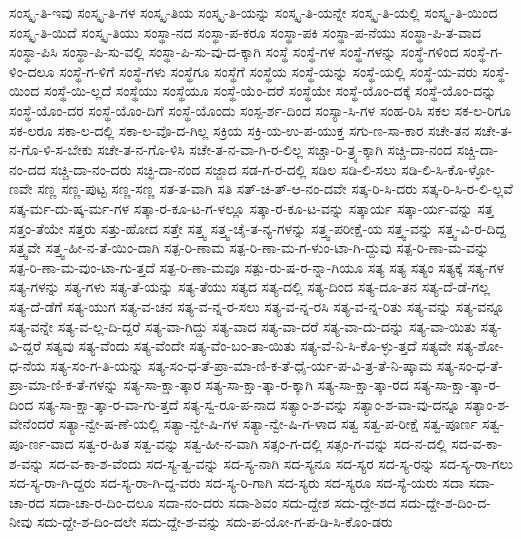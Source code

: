 {ಸಂಸ್ಕೃ-ತಿ-ಇವು
ಸಂಸ್ಕೃ-ತಿ-ಗಳ
ಸಂಸ್ಕೃ-ತಿಯ
ಸಂಸ್ಕೃ-ತಿ-ಯನ್ನು
ಸಂಸ್ಕೃ-ತಿ-ಯನ್ನೇ
ಸಂಸ್ಕೃ-ತಿ-ಯಲ್ಲಿ
ಸಂಸ್ಕೃ-ತಿ-ಯಿಂದ
ಸಂಸ್ಕೃ-ತಿ-ಯಿದೆ
ಸಂಸ್ಕೃ-ತಿಯು
ಸಂಸ್ಥಾ-ನದ
ಸಂಸ್ಥಾ-ಪ-ಕರೂ
ಸಂಸ್ಥಾ-ಪಕಿ
ಸಂಸ್ಥಾ-ಪ-ನೆಯು
ಸಂಸ್ಥಾ-ಪಿ-ತ-ವಾದ
ಸಂಸ್ಥಾ-ಪಿಸಿ
ಸಂಸ್ಥಾ-ಪಿ-ಸು-ವಲ್ಲಿ
ಸಂಸ್ಥಾ-ಪಿ-ಸು-ವು-ದ-ಕ್ಕಾಗಿ
ಸಂಸ್ಥೆ
ಸಂಸ್ಥೆ-ಗಳ
ಸಂಸ್ಥೆ-ಗಳನ್ನು
ಸಂಸ್ಥೆ-ಗಳಿಂದ
ಸಂಸ್ಥೆ-ಗ-ಳಿಂ-ದಲೂ
ಸಂಸ್ಥೆ-ಗ-ಳಿಗೆ
ಸಂಸ್ಥೆ-ಗಳು
ಸಂಸ್ಥೆಗೂ
ಸಂಸ್ಥೆಗೆ
ಸಂಸ್ಥೆಯ
ಸಂಸ್ಥೆ-ಯನ್ನು
ಸಂಸ್ಥೆ-ಯಲ್ಲಿ
ಸಂಸ್ಥೆ-ಯ-ವರು
ಸಂಸ್ಥೆ-ಯಿಂದ
ಸಂಸ್ಥೆ-ಯಿ-ಲ್ಲದೆ
ಸಂಸ್ಥೆಯು
ಸಂಸ್ಥೆಯೂ
ಸಂಸ್ಥೆ-ಯೆಂ-ದರೆ
ಸಂಸ್ಥೆಯೇ
ಸಂಸ್ಥೆ-ಯೊಂ-ದಕ್ಕೆ
ಸಂಸ್ಥೆ-ಯೊಂ-ದನ್ನು
ಸಂಸ್ಥೆ-ಯೊಂ-ದರ
ಸಂಸ್ಥೆ-ಯೊಂ-ದಿಗೆ
ಸಂಸ್ಥೆ-ಯೊಂದು
ಸಂಸ್ಪ-ರ್ಶ-ದಿಂದ
ಸಂಸ್ಯಾ-ಸಿ-ಗಳ
ಸಂಹ-ರಿಸಿ
ಸಕಲ
ಸಕ-ಲ-ರಿಗೂ
ಸಕ-ಲರೂ
ಸಕಾ-ಲ-ದಲ್ಲಿ
ಸಕಾ-ಲ-ವೊ-ದ-ಗಿಲ್ಲ
ಸಕ್ರಿಯ
ಸಕ್ರಿ-ಯ-ಉ-ಪ-ಯುಕ್ತ
ಸಗು-ಣ-ಸಾ-ಕಾರ
ಸಚೇ-ತನ
ಸಚೇ-ತ-ನ-ಗೊ-ಳಿ-ಸ-ಬೇಕು
ಸಚೇ-ತ-ನ-ಗೊ-ಳಿಸಿ
ಸಚೇ-ತ-ನ-ವಾ-ಗಿ-ರ-ಲಿಲ್ಲ
ಸಚ್ಚಾ-ರಿ-ತ್ರ್ಯ-ಕ್ಕಾಗಿ
ಸಚ್ಚಿ-ದಾ-ನಂದ
ಸಚ್ಚಿ-ದಾ-ನಂ-ದದ
ಸಚ್ಚಿ-ದಾ-ನಂ-ದರು
ಸಚ್ಛಿ-ದಾ-ನಂದ
ಸಜ್ಜಾದ
ಸಡ-ಗ-ರ-ದಲ್ಲಿ
ಸಡಿಲ
ಸಡಿ-ಲಿ-ಸಲು
ಸಡಿ-ಲಿ-ಸಿ-ಕೊ-ಳ್ಳೋ-ಣವೇ
ಸಣ್ಣ
ಸಣ್ಣ-ಪುಟ್ಟ
ಸಣ್ಣ-ಸಣ್ಣ
ಸತ-ತ-ವಾಗಿ
ಸತಿ
ಸತ್-ಚಿ-ತ್-ಆ-ನಂ-ದವೇ
ಸತ್ಕ-ರಿ-ಸಿ-ದರು
ಸತ್ಕ-ರಿ-ಸಿ-ರ-ಲಿ-ಲ್ಲವೆ
ಸತ್ಕ-ರ್ಮ-ದು-ಷ್ಕ-ರ್ಮ-ಗಳ
ಸತ್ಕಾ-ರ-ಕೂ-ಟ-ಗ-ಳಲ್ಲೂ
ಸತ್ಕಾ-ರ-ಕೂ-ಟ-ವನ್ನು
ಸತ್ಕಾರ್ಯ
ಸತ್ಕಾ-ರ್ಯ-ವನ್ನು
ಸತ್ತ
ಸತ್ತಂ-ತೆಯೇ
ಸತ್ತರು
ಸತ್ತು-ಹೋದ
ಸತ್ತೇ
ಸತ್ತ್ವ
ಸತ್ತ್ವ-ಚೈ-ತ-ನ್ಯ-ಗಳನ್ನು
ಸತ್ತ್ವ-ಪರೀಕ್ಷೆ-ಯ
ಸತ್ತ್ವ-ವನ್ನು
ಸತ್ತ್ವ-ವಿ-ರ-ದಿದ್ದ
ಸತ್ತ್ವವೇ
ಸತ್ತ್ವ-ಹೀ-ನ-ತೆ-ಯಿಂ-ದಾಗಿ
ಸತ್ಪ-ರಿ-ಣಾಮ
ಸತ್ಪ-ರಿ-ಣಾ-ಮ-ಗ-ಳುಂ-ಟಾ-ಗಿ-ದ್ದುವು
ಸತ್ಪ-ರಿ-ಣಾ-ಮ-ವನ್ನು
ಸತ್ಪ-ರಿ-ಣಾ-ಮ-ವುಂ-ಟಾ-ಗು-ತ್ತದೆ
ಸತ್ಪ-ರಿ-ಣಾ-ಮವೂ
ಸತ್ಪು-ರು-ಷ-ರ-ನ್ನಾ-ಗಿಯೂ
ಸತ್ಯ
ಸತ್ಯ
ಸತ್ಯಂ
ಸತ್ಯಕ್ಕೆ
ಸತ್ಯ-ಗಳ
ಸತ್ಯ-ಗಳನ್ನು
ಸತ್ಯ-ಗಳು
ಸತ್ಯ-ತೆ-ಯನ್ನು
ಸತ್ಯ-ತೆಯು
ಸತ್ಯದ
ಸತ್ಯ-ದಲ್ಲಿ
ಸತ್ಯ-ದಿಂದ
ಸತ್ಯ-ದೂ-ತನ
ಸತ್ಯ-ದೆ-ಡೆ-ಗಲ್ಲ
ಸತ್ಯ-ದೆ-ಡೆಗೆ
ಸತ್ಯ-ಯುಗ
ಸತ್ಯ-ವ-ಚನ
ಸತ್ಯ-ವ-ನ್ನ-ರ-ಸಲು
ಸತ್ಯ-ವ-ನ್ನ-ರಸಿ
ಸತ್ಯ-ವ-ನ್ನ-ರಿತು
ಸತ್ಯ-ವನ್ನು
ಸತ್ಯ-ವನ್ನೂ
ಸತ್ಯ-ವನ್ನೇ
ಸತ್ಯ-ವ-ಲ್ಲ-ದಿ-ದ್ದರೆ
ಸತ್ಯ-ವಾ-ಗಿದ್ದು
ಸತ್ಯ-ವಾದ
ಸತ್ಯ-ವಾ-ದರೆ
ಸತ್ಯ-ವಾ-ದು-ದನ್ನು
ಸತ್ಯ-ವಾ-ಯಿತು
ಸತ್ಯ-ವಿ-ದ್ದರೆ
ಸತ್ಯವು
ಸತ್ಯ-ವೆಂದು
ಸತ್ಯ-ವೆಂದೇ
ಸತ್ಯ-ವೆಂ-ಬಂ-ತಾ-ಯಿತು
ಸತ್ಯ-ವೆ-ನಿ-ಸಿ-ಕೊ-ಳ್ಳು-ತ್ತದೆ
ಸತ್ಯವೇ
ಸತ್ಯ-ಶೋ-ಧ-ನೆಯ
ಸತ್ಯ-ಸಂ-ಗ-ತಿ-ಯನ್ನು
ಸತ್ಯ-ಸಂ-ಧ-ತೆ-ಪ್ರಾ-ಮಾ-ಣಿ-ಕ-ತೆ-ಧೈ-ರ್ಯ-ಪ-ವಿ-ತ್ರ-ತೆ-ನಿ-ಷ್ಕಾಮ
ಸತ್ಯ-ಸಂ-ಧ-ತೆ-ಪ್ರಾ-ಮಾ-ಣಿ-ಕ-ತೆ-ಗಳನ್ನು
ಸತ್ಯ-ಸಾ-ಕ್ಷಾ-ತ್ಕಾರ
ಸತ್ಯ-ಸಾ-ಕ್ಷಾ-ತ್ಕಾ-ರ-ಕ್ಕಾಗಿ
ಸತ್ಯ-ಸಾ-ಕ್ಷಾ-ತ್ಕಾ-ರದ
ಸತ್ಯ-ಸಾ-ಕ್ಷಾ-ತ್ಕಾ-ರ-ದಿಂದ
ಸತ್ಯ-ಸಾ-ಕ್ಷಾ-ತ್ಕಾ-ರ-ವಾ-ಗು-ತ್ತದೆ
ಸತ್ಯ-ಸ್ವ-ರೂ-ಪ-ನಾದ
ಸತ್ಯಾಂ-ಶ-ವನ್ನು
ಸತ್ಯಾಂ-ಶ-ವಾ-ವು-ದನ್ನೂ
ಸತ್ಯಾಂ-ಶ-ವೇನೆಂದರೆ
ಸತ್ಯಾ-ನ್ವೇ-ಷ-ಣೆ-ಯಲ್ಲಿ
ಸತ್ಯಾ-ನ್ವೇ-ಷಿ-ಗಳ
ಸತ್ಯಾ-ನ್ವೇ-ಷಿ-ಗ-ಳಾದ
ಸತ್ವ
ಸತ್ವ-ಪ-ರೀಕ್ಷೆ
ಸತ್ವ-ಪೂರ್ಣ
ಸತ್ವ-ಪೂ-ರ್ಣ-ವಾದ
ಸತ್ವ-ರ-ಹಿತ
ಸತ್ವ-ವನ್ನು
ಸತ್ವ-ಹೀ-ನ-ವಾಗಿ
ಸತ್ಸಂ-ಗ-ದಲ್ಲಿ
ಸತ್ಸಂ-ಗ-ವನ್ನು
ಸದ-ನ-ದಲ್ಲಿ
ಸದ-ವ-ಕಾ-ಶ-ವನ್ನು
ಸದ-ವ-ಕಾ-ಶ-ವೆಂದು
ಸದ-ಸ್ಯ-ತ್ವ-ವನ್ನು
ಸದ-ಸ್ಯ-ನಾಗಿ
ಸದ-ಸ್ಯನೂ
ಸದ-ಸ್ಯರ
ಸದ-ಸ್ಯ-ರನ್ನು
ಸದ-ಸ್ಯ-ರಾ-ಗಲು
ಸದ-ಸ್ಯ-ರಾ-ಗಿ-ದ್ದರು
ಸದ-ಸ್ಯ-ರಾ-ಗಿ-ದ್ದ-ವರು
ಸದ-ಸ್ಯ-ರಿ-ಗಾಗಿ
ಸದ-ಸ್ಯರು
ಸದ-ಸ್ಯರೂ
ಸದ-ಸ್ಯೆ-ಯರು
ಸದಾ
ಸದಾ-ಚಾ-ರದ
ಸದಾ-ಚಾ-ರ-ದಿಂ-ದಲೂ
ಸದಾ-ನಂ-ದರು
ಸದಾ-ಶಿವಂ
ಸದು-ದ್ದೇಶ
ಸದು-ದ್ದೇ-ಶದ
ಸದು-ದ್ದೇ-ಶ-ದಿಂ-ದ-ನೀವು
ಸದು-ದ್ದೇ-ಶ-ದಿಂ-ದಲೇ
ಸದು-ದ್ದೇ-ಶ-ವನ್ನು
ಸದು-ಪ-ಯೋ-ಗ-ಪ-ಡಿ-ಸಿ-ಕೊಂ-ಡರು
}
